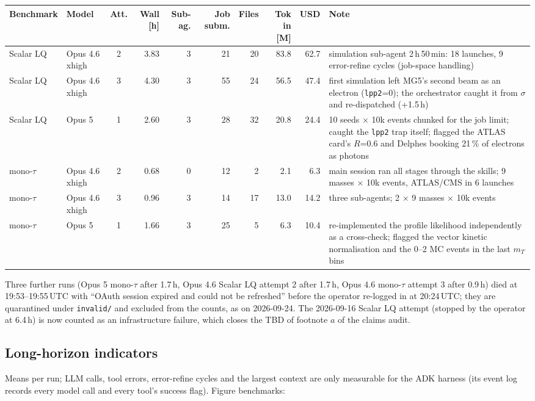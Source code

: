 \documentclass[10pt,a4paper]{article}
\newcommand{\code}[1]{\texttt{#1}}
\begin{document}
\begin{center}\scriptsize\setlength{\tabcolsep}{3pt}
\begin{tabular}{llcrrrrrrp{5.6cm}}
\toprule
Benchmark & Model & Att. & Wall [h] & Sub-ag. & Job subm. & Files & Tok in [M] & USD & Note \\
\midrule
Scalar LQ & Opus 4.6 xhigh & 2 & 3.83 & 3 & 21 & 20 & 83.8 & 62.7 & simulation sub-agent 2\,h\,50\,min: 18 launches, 9 error-refine cycles (job-space handling) \\
Scalar LQ & Opus 4.6 xhigh & 3 & 4.30 & 3 & 55 & 24 & 56.5 & 47.4 & first simulation left MG5's second beam as an electron (\code{lpp2}=0); the orchestrator caught it from $\sigma$ and re-dispatched (+1.5\,h) \\
Scalar LQ & Opus 5 & 1 & 2.60 & 3 & 28 & 32 & 20.8 & 24.4 & 10 seeds $\times$ 10k events chunked for the job limit; caught the \code{lpp2} trap itself; flagged the ATLAS card's $R$=0.6 and Delphes booking 21\,\% of electrons as photons \\
mono-$\tau$ & Opus 4.6 xhigh & 2 & 0.68 & 0 & 12 & 2 & 2.1 & 6.3 & main session ran all stages through the skills; 9 masses $\times$ 10k events, ATLAS/CMS in 6 launches \\
mono-$\tau$ & Opus 4.6 xhigh & 3 & 0.96 & 3 & 14 & 17 & 13.0 & 14.2 & three sub-agents; 2 $\times$ 9 masses $\times$ 10k events \\
mono-$\tau$ & Opus 5 & 1 & 1.66 & 3 & 25 & 5 & 6.3 & 10.4 & re-implemented the profile likelihood independently as a cross-check; flagged the vector kinetic normalisation and the 0--2 MC events in the last $m_T$ bins \\
\bottomrule
\end{tabular}
\end{center}

Three further runs (Opus 5 mono-$\tau$ after 1.7\,h, Opus 4.6 Scalar LQ attempt 2 after 1.7\,h, Opus 4.6 mono-$\tau$ attempt 3
after 0.9\,h) died at 19:53--19:55\,UTC with ``OAuth session expired and could not be refreshed'' before the operator re-logged
in at 20:24\,UTC; they are quarantined under \code{invalid/} and excluded from the counts, as on 2026-09-24. The 2026-09-16
Scalar LQ attempt (stopped by the operator at 6.4\,h) is now counted as an infrastructure failure, which closes the TBD of
footnote $a$ of the claims audit.

\subsection{Long-horizon indicators}
Means per run; LLM calls, tool errors, error-refine cycles and the largest context are only measurable for the ADK harness (its event log records every model call and every tool's success flag). Figure benchmarks:
\end{document}
